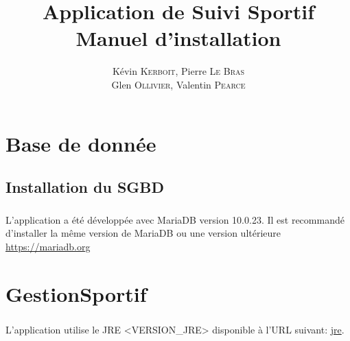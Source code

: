 \documentclass[french,12pt,a4paper,openany]{book}
\author{Kévin \textsc{Kerboit}, Pierre \textsc{Le Bras}\\Glen \textsc{Ollivier}, Valentin \textsc{Pearce}}
\date{}
\begin{document}
\title{Application de Suivi Sportif \\ Manuel d'installation}
\maketitle
\tableofcontents
\chapter{Base de donnée}
\section{Installation du SGBD}
\paragraph{}{L'application a été développée avec MariaDB version 10.0.23. Il est recommandé d'installer la même version de MariaDB ou une version ultérieure \url{https://mariadb.org} }
\chapter{GestionSportif}
\paragraph{}{L'application utilise le JRE <VERSION\_JRE> disponible à l'URL suivant:  \url{jre}.}
\end{document}
